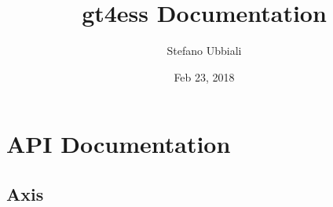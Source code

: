 \documentclass[letterpaper,10pt,english]{sphinxmanual}
\title{gt4ess Documentation}
\date{Feb 23, 2018}
\author{Stefano Ubbiali}
\begin{document}
\maketitle
\sphinxtableofcontents
{}\label{\detokenize{index::doc}}



\chapter{API Documentation}
\label{\detokenize{api:welcome-to-gt4ess-s-documentation}}\label{\detokenize{api:api-documentation}}\label{\detokenize{api::doc}}

\section{Axis}
\label{\detokenize{api:axis}}
\end{document}
